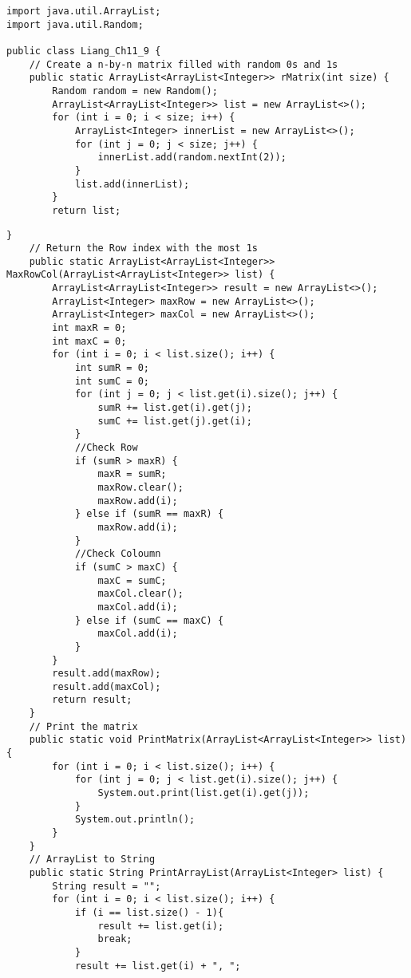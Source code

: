 \documentclass{article}
\begin{document}
\begin{enumerate}
\begin{lstlisting}[backgroundcolor=\color{bg}]
import java.util.ArrayList;
import java.util.Random;

public class Liang_Ch11_9 {
    // Create a n-by-n matrix filled with random 0s and 1s
    public static ArrayList<ArrayList<Integer>> rMatrix(int size) {
        Random random = new Random();
        ArrayList<ArrayList<Integer>> list = new ArrayList<>();
        for (int i = 0; i < size; i++) {
            ArrayList<Integer> innerList = new ArrayList<>();
            for (int j = 0; j < size; j++) {
                innerList.add(random.nextInt(2));
            }
            list.add(innerList);
        }
        return list;
        \end{lstlisting}
        \begin{lstlisting}[backgroundcolor=\color{bg}]
    }
    // Return the Row index with the most 1s
    public static ArrayList<ArrayList<Integer>> MaxRowCol(ArrayList<ArrayList<Integer>> list) {
        ArrayList<ArrayList<Integer>> result = new ArrayList<>();
        ArrayList<Integer> maxRow = new ArrayList<>();
        ArrayList<Integer> maxCol = new ArrayList<>();
        int maxR = 0;
        int maxC = 0;
        for (int i = 0; i < list.size(); i++) {
            int sumR = 0;
            int sumC = 0;
            for (int j = 0; j < list.get(i).size(); j++) {
                sumR += list.get(i).get(j);
                sumC += list.get(j).get(i);
            }
            //Check Row
            if (sumR > maxR) {
                maxR = sumR;
                maxRow.clear();
                maxRow.add(i);
            } else if (sumR == maxR) {
                maxRow.add(i);
            }
            //Check Coloumn
            if (sumC > maxC) {
                maxC = sumC;
                maxCol.clear();
                maxCol.add(i);
            } else if (sumC == maxC) {
                maxCol.add(i);
            }
        }
        result.add(maxRow);
        result.add(maxCol);
        return result;
    }
    // Print the matrix
    public static void PrintMatrix(ArrayList<ArrayList<Integer>> list) {
        for (int i = 0; i < list.size(); i++) {
            for (int j = 0; j < list.get(i).size(); j++) {
                System.out.print(list.get(i).get(j));
            }
            System.out.println();
        }
    }
    // ArrayList to String
    public static String PrintArrayList(ArrayList<Integer> list) {
        String result = "";
        for (int i = 0; i < list.size(); i++) {
            if (i == list.size() - 1){
                result += list.get(i);
                break;
            }
            result += list.get(i) + ", ";

\end{lstlisting}
\end{enumerate}
\end{document}

